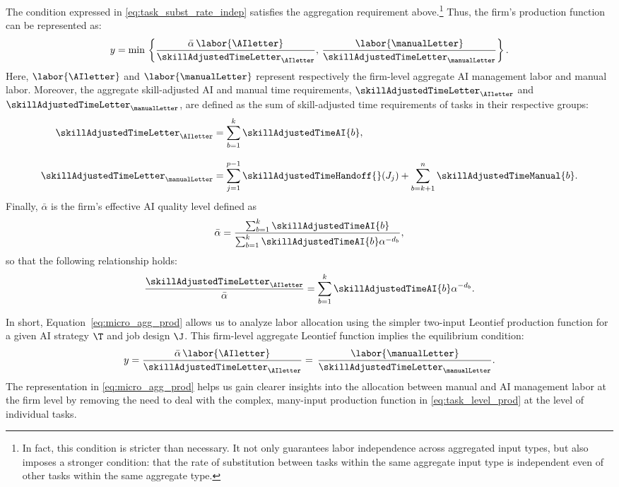 The condition expressed in \eqref{eq:task_subst_rate_indep} satisfies the aggregation requirement above.\footnote{In fact, this condition is stricter than necessary. It not only guarantees labor independence across aggregated input types, but also imposes a stronger condition: that the rate of substitution between tasks within the same aggregate input type is independent even of other tasks within the same aggregate type.}
Thus, the firm's production function can be represented as:
\begin{equation}
y=\min\,\left\{\frac{\bar{\alpha}\,\labor{\AIletter}}{\skillAdjustedTimeLetter_{\AIletter}},\,\frac{\labor{\manualLetter}}{\skillAdjustedTimeLetter_{\manualLetter}}\right\}.\label{eq:micro_agg_prod}
\end{equation}
Here, $\labor{\AIletter}$ and $\labor{\manualLetter}$ represent respectively the firm-level aggregate AI management labor and manual labor.
Moreover, the aggregate skill-adjusted AI and manual time requirements, $\skillAdjustedTimeLetter_{\AIletter}$ and $\skillAdjustedTimeLetter_{\manualLetter}$, are defined as the sum of skill-adjusted time requirements of tasks in their respective groups:
\begin{align}
\skillAdjustedTimeLetter_{\AIletter} & = \sum_{b=1}^{k}\skillAdjustedTimeAI{b}, \label{eq:def_t_AI}\\[8pt]
\skillAdjustedTimeLetter_{\manualLetter} & = \sum_{j=1}^{p-1}\skillAdjustedTimeHandoff{}(J_j) + \sum_{b=k+1}^{n}\skillAdjustedTimeManual{b}. \label{eq:def_t_H}
\end{align}
Finally, $\bar{\alpha}$ is the firm's effective AI quality level defined as
\begin{equation}
\bar{\alpha}=\frac{\sum_{b=1}^{k}\skillAdjustedTimeAI{b}}{\sum_{b=1}^{k}\skillAdjustedTimeAI{b}\alpha^{-d_{b}}},\label{eq:alpha_bar}
\end{equation}
so that the following relationship holds:
\[
\frac{\skillAdjustedTimeLetter_{\AIletter}}{\bar{\alpha}}=\sum_{b=1}^{k}\skillAdjustedTimeAI{b}\alpha^{-d_{b}}.
\]

In short, Equation~\eqref{eq:micro_agg_prod} allows us to analyze labor allocation using the simpler two-input Leontief production function for a given AI strategy \( \T \) and job design \( \J \).
This firm-level aggregate Leontief function implies the equilibrium condition:
\begin{equation}
y=\frac{\bar{\alpha}\,\labor{\AIletter}}{\skillAdjustedTimeLetter_{\AIletter}}
=\,\frac{\labor{\manualLetter}}{\skillAdjustedTimeLetter_{\manualLetter}}.
\label{eq:micro_fixed_proportions}
\end{equation}
The representation in \eqref{eq:micro_agg_prod} helps us gain clearer insights into the allocation between manual and AI management labor at the firm level by removing the need to deal with the complex, many-input production function in \eqref{eq:task_level_prod} at the level of individual tasks.



